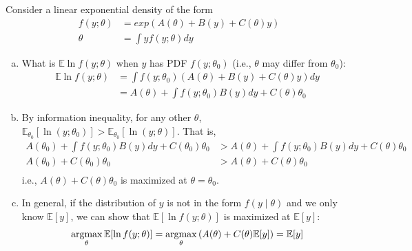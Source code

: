 \documentclass[11pt]{elegantbook}
\newcommand{\argmax}{\operatornamewithlimits{argmax}}
\begin{document}
\begin{example}
    Consider a linear exponential density of the form
    \begin{equation}
        \begin{aligned}
            f(y;\theta)&=exp\left(A(\theta)+B(y)+C(\theta)y\right)\\
            \theta&=\int yf(y;\theta)dy
        \end{aligned}
        \nonumber
    \end{equation}
\end{example}
\begin{enumerate}[(a).]
    \item What is $\mathbb{E} \ln f(y ; \theta)$ when $y$ has PDF $f(y ; \theta_0)$ (i.e., $\theta$ may differ from $\theta_0$):
    \begin{equation}
        \begin{aligned}
            \mathbb{E}\ln f(y;\theta)&=\int f(y ; \theta_0) \left(A(\theta)+B(y)+C(\theta)y\right)dy\\
            &=A(\theta)+\int f(y ; \theta_0)B(y)dy+C(\theta)\theta_0
        \end{aligned}
        \nonumber
    \end{equation}
    \item By information inequality, for any other $\theta$, $\mathbb{E}_{\theta_0}[\ln (y;\theta_0)]>\mathbb{E}_{\theta_0}[\ln (y;\theta)]$. That is,
    \begin{equation}
        \begin{aligned}
            A(\theta_0)+\int f(y ; \theta_0)B(y)dy+C(\theta_0)\theta_0&>A(\theta)+\int f(y ; \theta_0)B(y)dy+C(\theta)\theta_0\\
            A(\theta_0)+C(\theta_0)\theta_0&>A(\theta)+C(\theta)\theta_0\\
        \end{aligned}
        \nonumber
    \end{equation}
    i.e., $A(\theta)+C(\theta)\theta_0$ is maximized at $\theta=\theta_0$.
    \item In general, if the distribution of $y$ is not in the form $f(y\mid \theta)$ and we only know $\mathbb{E}[y]$, we can show that $\mathbb{E}[\ln f(y;\theta)]$ is maximized at $\mathbb{E}[y]$:
    \begin{equation}
        \begin{aligned}
            \argmax_\theta \mathbb{E}[\ln f(y;\theta)] = \argmax_\theta \left(A(\theta)+C(\theta)\mathbb{E}[y]\right)=\mathbb{E}[y]
        \end{aligned}

\end{equation}
\end{enumerate}
\end{document}
